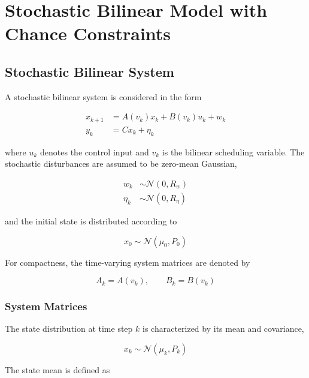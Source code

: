 \chapter{Stochastic Bilinear Model with Chance Constraints}

\section{Stochastic Bilinear System}
\label{sec:stochastic_bilinear_system}

A stochastic bilinear system is considered in the form

\begin{align}
    x_{k+1}
    &=
    A(v_k)x_k
    +
    B(v_k)u_k
    +
    w_k
    \label{eq:sb_state}\\
    y_k
    &=
    Cx_k+\eta_k
    \label{eq:sb_output}
\end{align}

where \(u_k\) denotes the control input and \(v_k\) is the
bilinear scheduling variable. The stochastic disturbances are assumed to be
zero-mean Gaussian,

\begin{align}
    w_k &\sim \mathcal{N}(0,R_w)\\
    \eta_k &\sim \mathcal{N}(0,R_\eta)
\end{align}

and the initial state is distributed according to

\begin{equation}
    x_0 \sim \mathcal{N}(\mu_0,P_0)
\end{equation}

For compactness, the time-varying system matrices are denoted by

\begin{equation}
    A_k=A(v_k),
    \qquad
    B_k=B(v_k)
\end{equation}

\subsection{System Matrices}

The state distribution at time step \(k\) is characterized by its mean
and covariance,

\begin{equation}
    x_k \sim \mathcal{N}(\mu_k,P_k)
\end{equation}

The state mean is defined as

